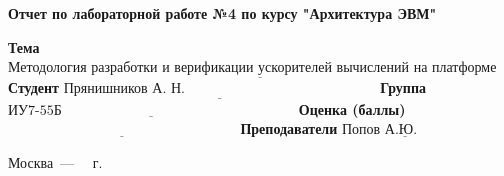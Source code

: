 \begin{titlepage}
	
	\begin{center}
		\Large\textbf{Отчет по лабораторной работе №4 по курсу "Архитектура ЭВМ"}\newline
	\end{center}
	
	\noindent\textbf{Тема} $\underline{\text{Методология разработки и верификации ускорителей вычислений на платформе Xilinx Alveo}}$\newline\newline\newline
	\noindent\textbf{Студент} $\underline{\text{Прянишников А. Н.~~~~~~~~~~~~~~~~~~~~~~~~~~~~~~~~~~~~~~~~~}}$\newline\newline
	\noindent\textbf{Группа} $\underline{\text{ИУ7-55Б~~~~~~~~~~~~~~~~~~~~~~~~~~~~~~~~~~~~~~~~~~~~~~~~~~}}$\newline\newline
	\noindent\textbf{Оценка (баллы)} $\underline{\text{~~~~~~~~~~~~~~~~~~~~~~~~~~~~~~~~~~~~~~~~~~~~~~~~~}}$\newline\newline
	\noindent\textbf{Преподаватели} $\underline{\text{Попов А.Ю.~~~~~~~~~~~}}$\newline
	
	\begin{center}
		\vfill
		Москва~---~\the\year
		~г.
	\end{center}
	\restoregeometry
\end{titlepage}
